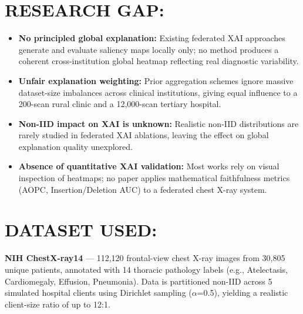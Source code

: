 \documentclass[10pt,a4paper]{article}
\begin{document}
\section*{RESEARCH GAP:}
\begin{itemize}
  \item \textbf{No principled global explanation:} Existing federated XAI approaches generate and
        evaluate saliency maps locally only; no method produces a coherent cross-institution global
        heatmap reflecting real diagnostic variability.
  \item \textbf{Unfair explanation weighting:} Prior aggregation schemes ignore massive dataset-size
        imbalances across clinical institutions, giving equal influence to a 200-scan rural clinic
        and a 12,000-scan tertiary hospital.
  \item \textbf{Non-IID impact on XAI is unknown:} Realistic non-IID distributions are rarely studied
        in federated XAI ablations, leaving the effect on global explanation quality unexplored.
  \item \textbf{Absence of quantitative XAI validation:} Most works rely on visual inspection of
        heatmaps; no paper applies mathematical faithfulness metrics (AOPC, Insertion/Deletion AUC)
        to a federated chest X-ray system.
\end{itemize}

\section*{DATASET USED:}
\textbf{NIH ChestX-ray14} --- 112,120 frontal-view chest X-ray images from 30,805 unique patients,
annotated with 14 thoracic pathology labels (e.g., Atelectasis, Cardiomegaly, Effusion, Pneumonia).
Data is partitioned non-IID across 5 simulated hospital clients using Dirichlet sampling ($\alpha$=0.5),
yielding a realistic client-size ratio of up to 12:1.

\end{document}
